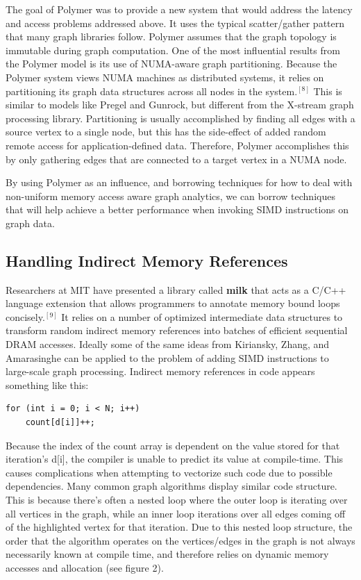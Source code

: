 \documentclass[conference]{IEEEtran}
\begin{document}
The goal of Polymer was to provide a new system that would address the latency and access problems addressed above.  It uses the typical scatter/gather pattern that many graph libraries follow.  Polymer assumes that the graph topology is immutable during graph computation.  One of the most influential results from the Polymer model is its use of NUMA-aware graph partitioning.  Because the Polymer system views NUMA machines as distributed systems, it relies on partitioning its graph data structures across all nodes in the system.$^{[8]}$  This is similar to models like Pregel and Gunrock, but different from the X-stream graph processing library.  Partitioning is usually accomplished by finding all edges with a source vertex to a single node, but this has the side-effect of added random remote access for application-defined data.  Therefore, Polymer accomplishes this by only gathering edges that are connected to a target vertex in a NUMA node.  

By using Polymer as an influence, and borrowing techniques for how to deal with non-uniform memory access aware graph analytics, we can borrow techniques that will help achieve a better performance when invoking SIMD instructions on graph data.  

\subsection{Handling Indirect Memory References}

Researchers at MIT have presented a library called \textbf{milk} that acts as a C/C++ language extension that allows programmers to annotate memory bound loops concisely.$^{[9]}$  It relies on a number of optimized intermediate data structures to transform random indirect memory references into batches of efficient sequential DRAM accesses.  Ideally some of the same ideas from Kiriansky, Zhang, and Amarasinghe can be applied to the problem of adding SIMD instructions to large-scale graph processing.  Indirect memory references in code appears something like this:
\begin{verbatim}
for (int i = 0; i < N; i++)
    count[d[i]]++;
\end{verbatim}
Because the index of the count array is dependent on the value stored for that iteration's d[i], the compiler is unable to predict its value at compile-time.  This causes complications when attempting to vectorize such code due to possible dependencies.  Many common graph algorithms display similar code structure.  This is because there's often a nested loop where the outer loop is iterating over all vertices in the graph, while an inner loop iterations over all edges coming off of the highlighted vertex for that iteration.  Due to this nested loop structure, the order that the algorithm operates on the vertices/edges in the graph is not always necessarily known at compile time, and therefore relies on dynamic memory accesses and allocation (see figure 2).  
\end{document}
